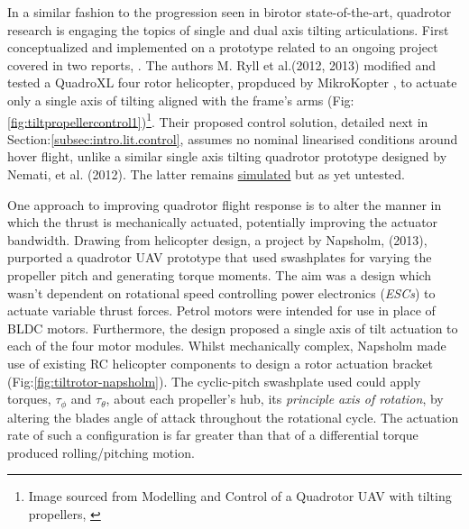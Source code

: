 \par
In a similar fashion to the progression seen in birotor state-of-the-art, quadrotor research is engaging the topics of single and dual axis tilting articulations. First conceptualized and implemented on a prototype related to an ongoing project covered in two reports, \cite{tiltpropellercontrol,tiltpropellerflight}. The authors M. Ryll et al.(2012, 2013) modified and tested a QuadroXL four rotor helicopter, propduced by MikroKopter \cite{mikrokopter}, to actuate only a single axis of tilting aligned with the frame's arms (Fig:\ref{fig:tiltpropellercontrol1})\footnote{Image sourced from Modelling and Control of a Quadrotor UAV with tilting propellers, \cite{tiltpropellercontrol}}. Their proposed control solution, detailed next in Section:\ref{subsec:intro.lit.control}, assumes no nominal linearised conditions around hover flight, unlike a similar single axis tilting quadrotor prototype designed by Nemati, et al. (2012)\cite{singleaxistilting}. The latter remains  \underline{simulated} but as yet untested.
\par
One approach to improving quadrotor flight response is to alter the manner in which the thrust is mechanically actuated, potentially improving the actuator bandwidth. Drawing from helicopter design, a project by Napsholm, (2013)\cite{napsholm}, purported a quadrotor UAV prototype that used swashplates for varying the propeller pitch and generating torque moments. The aim was a design which wasn't dependent on rotational speed controlling power electronics (\emph{ESCs}) to actuate variable thrust forces. Petrol motors were intended for use in place of BLDC motors. Furthermore, the design proposed a single axis of tilt actuation to each of the four motor modules. Whilst mechanically complex, Napsholm made use of existing RC helicopter components to design a rotor actuation bracket (Fig:\ref{fig:tiltrotor-napsholm}). The cyclic-pitch swashplate used \cite{autonomousrobotspitch} could apply torques, $\tau_{\phi}$ and $\tau_{\theta}$, about each propeller's hub, its \emph{principle axis of rotation}, by altering the blades angle of attack throughout the rotational cycle. The actuation rate of such a configuration is far greater than that of a differential torque produced rolling/pitching motion.
